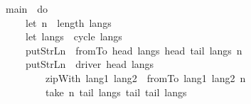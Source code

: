 \documentclass[12pt]{article}
\begin{document}
\begin{tabbing}\ttfamily
~~~main~~do\\
\ttfamily ~~~~~~~let~n~~length~langs\\
\ttfamily ~~~~~~~let~langs~~cycle~langs\\
\ttfamily ~~~~~~~putStrLn~~fromTo~head~langs~head~tail~langs~n\\
\ttfamily ~~~~~~~putStrLn~~driver~head~langs~\\
\ttfamily ~~~~~~~~~~~zipWith~lang1~lang2~~fromTo~lang1~lang2~n\\
\ttfamily ~~~~~~~~~~~take~n~tail~langs~tail~tail~langs
\end{tabbing}
\end{document}
